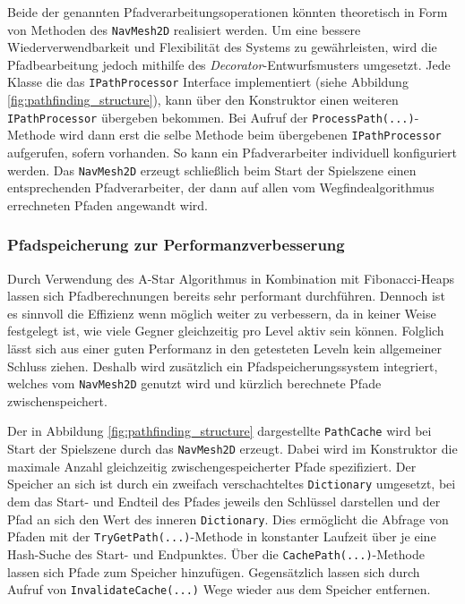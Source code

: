Beide der genannten Pfadverarbeitungsoperationen könnten theoretisch in Form von Methoden des \texttt{NavMesh2D} realisiert werden. Um eine bessere Wiederverwendbarkeit und Flexibilität des Systems zu gewährleisten, wird die Pfadbearbeitung jedoch mithilfe des \textit{Decorator}-Entwurfsmusters \cite[175]{Design_Patterns} umgesetzt. Jede Klasse die das \texttt{IPathProcessor} Interface implementiert (siehe Abbildung \ref{fig:pathfinding_structure}), kann über den Konstruktor einen weiteren \texttt{IPathProcessor} übergeben bekommen. Bei Aufruf der \texttt{ProcessPath(...)}-Methode wird dann erst die selbe Methode beim übergebenen \texttt{IPathProcessor} aufgerufen, sofern vorhanden. So kann ein Pfadverarbeiter individuell konfiguriert werden. Das \texttt{NavMesh2D} erzeugt schließlich beim Start der Spielszene einen entsprechenden Pfadverarbeiter, der dann auf allen vom Wegfindealgorithmus errechneten Pfaden angewandt wird.

\subsubsection{Pfadspeicherung zur Performanzverbesserung}\label{sec:pathCaching}
Durch Verwendung des A-Star Algorithmus in Kombination mit Fibonacci-Heaps lassen sich Pfadberechnungen bereits sehr performant durchführen. Dennoch ist es sinnvoll die Effizienz wenn möglich weiter zu verbessern, da in keiner Weise festgelegt ist, wie viele Gegner gleichzeitig pro Level aktiv sein können. Folglich lässt sich aus einer guten Performanz in den getesteten Leveln kein allgemeiner Schluss ziehen. Deshalb wird zusätzlich ein Pfadspeicherungssystem integriert, welches vom \texttt{NavMesh2D} genutzt wird und kürzlich berechnete Pfade zwischenspeichert.

Der in Abbildung \ref{fig:pathfinding_structure} dargestellte \texttt{PathCache} wird bei Start der Spielszene durch das \texttt{NavMesh2D} erzeugt. Dabei wird im Konstruktor die maximale Anzahl gleichzeitig zwischengespeicherter Pfade spezifiziert. Der Speicher an sich ist durch ein zweifach verschachteltes \texttt{Dictionary} umgesetzt, bei dem das Start- und Endteil des Pfades jeweils den Schlüssel darstellen und der Pfad an sich den Wert des inneren \texttt{Dictionary}. Dies ermöglicht die Abfrage von Pfaden mit der \texttt{TryGetPath(...)}-Methode in konstanter Laufzeit über je eine Hash-Suche des Start- und Endpunktes. Über die \texttt{CachePath(...)}-Methode lassen sich Pfade zum Speicher hinzufügen. Gegensätzlich lassen sich durch Aufruf von \texttt{InvalidateCache(...)} Wege wieder aus dem Speicher entfernen.

